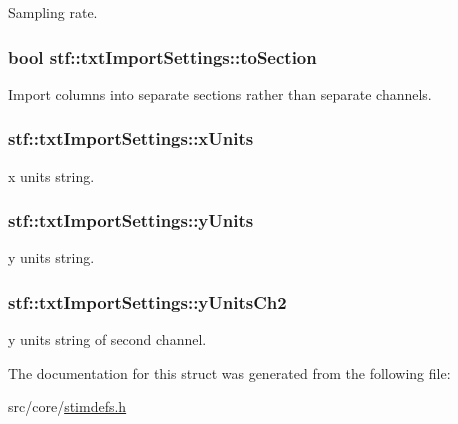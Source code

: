 \label{structstf_1_1txtImportSettings_a33e95b58e6cb81cd96c84ae89445f9be}
Sampling rate. \hypertarget{structstf_1_1txtImportSettings_a5f475ef7099fe1cc9fb806b666a63459}{
\subsubsection[{toSection}]{\setlength{\rightskip}{0pt plus 5cm}bool {\bf stf::txtImportSettings::toSection}}}
\label{structstf_1_1txtImportSettings_a5f475ef7099fe1cc9fb806b666a63459}
Import columns into separate sections rather than separate channels. \hypertarget{structstf_1_1txtImportSettings_aba0b71808e781ffff32bb560aa9a1d2a}{
\subsubsection[{xUnits}]{ {\bf stf::txtImportSettings::xUnits}}}
\label{structstf_1_1txtImportSettings_aba0b71808e781ffff32bb560aa9a1d2a}
x units string. \hypertarget{structstf_1_1txtImportSettings_a34394c27542cef2553d2c5b774fe31cd}{
\subsubsection[{yUnits}]{ {\bf stf::txtImportSettings::yUnits}}}
\label{structstf_1_1txtImportSettings_a34394c27542cef2553d2c5b774fe31cd}
y units string. \hypertarget{structstf_1_1txtImportSettings_abbc806479b71e4a566b0f997fe9ca006}{
\subsubsection[{yUnitsCh2}]{ {\bf stf::txtImportSettings::yUnitsCh2}}}
\label{structstf_1_1txtImportSettings_abbc806479b71e4a566b0f997fe9ca006}
y units string of second channel. 

The documentation for this struct was generated from the following file:\begin{DoxyCompactItemize}
\item 
src/core/\hyperlink{stimdefs_8h}{stimdefs.h}\end{DoxyCompactItemize}
